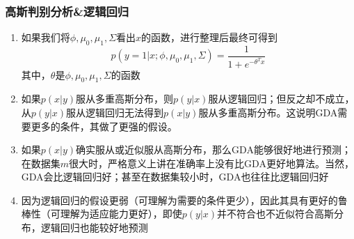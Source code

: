 \subsubsection{高斯判别分析\&逻辑回归}
\begin{enumerate}
	\item 如果我们将$\phi, \mu_0, \mu_1, \Sigma$看出$x$的函数，进行整理后最终可得到
	\begin{equation}
		p(y=1|x; \phi, \mu_0, \mu_1, \Sigma) = \frac{1}{1+e^{-\theta^Tx}}
	\end{equation}
	其中，$\theta$是$\phi, \mu_0, \mu_1, \Sigma$的函数
	\item 如果$p(x|y)$服从多重高斯分布，则$p(y|x)$服从逻辑回归；但反之却不成立，从$p(y|x)$服从逻辑回归无法得到$p(x|y)$服从多重高斯分布。这说明GDA需要更多的条件，其做了更强的假设。
	\item 如果$p(x|y)$确实服从或近似服从高斯分布，那么GDA能够很好地进行预测；在数据集$m$很大时，严格意义上讲在准确率上没有比GDA更好地算法。当然，GDA会比逻辑回归好；甚至在数据集较小时，GDA也往往比逻辑回归好
	\item 因为逻辑回归的假设更弱（可理解为需要的条件更少），因此其具有更好的鲁棒性（可理解为适应能力更好），即使$p(y|x)$并不符合也不近似符合高斯分布，逻辑回归也能较好地预测
\end{enumerate}















